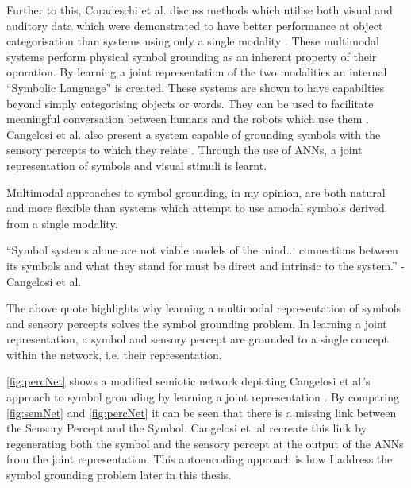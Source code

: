 Further to this, Coradeschi et al. discuss methods which utilise both visual and auditory data which were demonstrated to have better performance at object categorisation than systems using only a single modality \cite{coradeschi2013short}. These multimodal systems perform physical symbol grounding as an inherent property of their oporation. By learning a joint representation of the two modalities an internal ``Symbolic Language'' is created. These systems are shown to have capabilties beyond simply categorising objects or words. They can be used to facilitate meaningful conversation between humans and the robots which use them \cite{nakamura2009grounding, nakamura2011grounding}. Cangelosi et al. also present a system capable of grounding symbols with the sensory percepts to which they relate \cite{cangelosi2000robotic}. Through the use of \acp{ANN}, a joint representation of symbols and visual stimuli is learnt.

Multimodal approaches to symbol grounding, in my opinion, are both natural and more flexible than systems which attempt to use amodal symbols derived from a single modality.

\begin{displayquote}
``Symbol systems alone are not viable models of the mind... connections between its symbols and what they stand for must be direct and intrinsic to the system.'' - Cangelosi et al.
\end{displayquote}

The above quote highlights why learning a multimodal representation of symbols and sensory percepts solves the symbol grounding problem. In learning a joint representation, a symbol and sensory percept are grounded to a single concept within the network, i.e. their representation.

\autoref{fig:percNet} shows a modified semiotic network depicting Cangelosi et al.'s approach to symbol grounding by learning a joint representation \cite{cangelosi2000robotic}. By comparing \autoref{fig:semNet} and \autoref{fig:percNet} it can be seen that there is a missing link between the Sensory Percept and the Symbol. Cangelosi et. al recreate this link by regenerating both the symbol and the sensory percept at the output of the \acp{ANN} from the joint representation. This autoencoding approach is how I address the symbol grounding problem later in this thesis.

